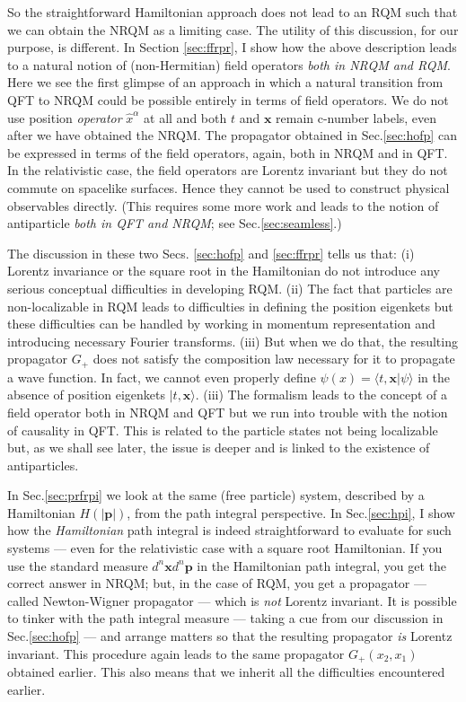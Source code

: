\documentclass[12pt]{article}
\def\ket#1{|#1\rangle}                    %
\def\amp#1#2{\langle #1 | #2\rangle}      %
\begin{document}
So the straightforward Hamiltonian approach does not lead to an RQM such that we can obtain the NRQM as a limiting case. The utility of this discussion, for our purpose, is different. In
 Section \ref{sec:ffrpr}, I show how the above description leads to a natural notion of (non-Hermitian) field operators \textit{both in NRQM and RQM}. Here we see the first glimpse of an approach in which a  natural transition  from QFT to NRQM could be possible entirely in terms of field operators. We do not use position \textit{operator} $\hat x^\alpha$ at all and both $t$ and $\bm{x}$ remain c-number labels, even after we have obtained the NRQM. The propagator obtained in Sec.\ref{sec:hofp} can be expressed in terms of the field operators, again,  both in NRQM and in QFT. In the relativistic case, the field operators are Lorentz invariant but they do not commute on spacelike surfaces. Hence they cannot be used to construct physical observables directly. (This requires some more work  and leads to  the notion of antiparticle \textit{both in QFT and NRQM};  see Sec.\ref{sec:seamless}.) 
 
 The discussion in these two Secs. \ref{sec:hofp} and \ref{sec:ffrpr} tells us that: (i) Lorentz invariance or the square root in the Hamiltonian do not introduce any serious conceptual difficulties in developing RQM. (ii) The fact that particles are non-localizable in RQM leads to difficulties in defining the position eigenkets but these difficulties can be handled by working in momentum representation and introducing necessary Fourier transforms. (iii) But when we do that, the resulting propagator $G_+$ does not satisfy the composition law necessary for it to propagate a wave function. In fact, we cannot even properly define $\psi(x)=\amp{t,\bm{x}}{\psi}$ in the absence of position eigenkets $\ket{t,\bm{x}}$. (iii) The formalism leads to the concept of a field operator  both in NRQM and QFT but we run into trouble with the notion of causality in QFT. This is related to the particle states not being localizable but, as we shall see later, the issue is deeper and is linked to the existence of antiparticles. 
 
 In Sec.\ref{sec:prfrpi} we look at the  same (free particle) system, described by a Hamiltonian $H(|\bm{p}|)$, from the path integral perspective. In Sec.\ref{sec:hpi}, I show how the \textit{Hamiltonian} path integral is indeed straightforward to evaluate for such systems --- even for the relativistic case with a square root Hamiltonian.  If you use the standard measure $d^n\bm{x} d^n\bm{p}$ in the Hamiltonian path integral, you get the correct answer in NRQM; but, in the case of RQM, you get a propagator --- called Newton-Wigner propagator --- which is \textit{not} Lorentz invariant.  It is possible to tinker with the path integral measure --- taking a cue from our discussion in Sec.\ref{sec:hofp} --- and arrange matters so that the resulting propagator \textit{is} Lorentz invariant. This procedure again leads to the same propagator $G_+(x_2,x_1)$ obtained earlier. This  also means that we inherit all the difficulties encountered earlier. 
 
\end{document}
